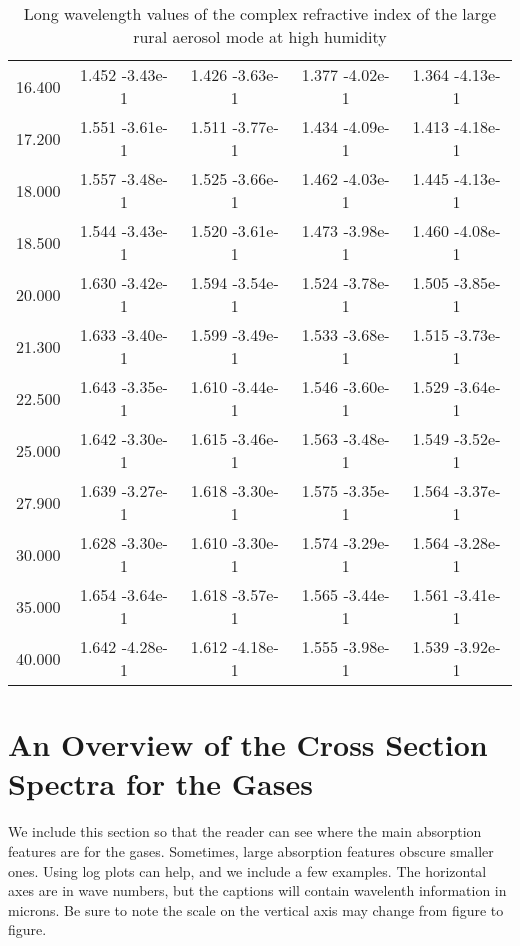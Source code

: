 \documentclass[12pt]{article}
\begin{document}
\begin{center}
\begin{table}
\begin{tabular}{| c | c | c | c | c |  }
16.400  &   1.452   -3.43e-1 &   1.426   -3.63e-1  &  1.377   -4.02e-1  &  1.364   -4.13e-1  \\
17.200  &   1.551   -3.61e-1  &  1.511   -3.77e-1 &   1.434   -4.09e-1 &   1.413   -4.18e-1  \\
18.000  &   1.557   -3.48e-1 &   1.525   -3.66e-1 &   1.462   -4.03e-1 &   1.445   -4.13e-1  \\
18.500  &   1.544   -3.43e-1 &   1.520   -3.61e-1 &   1.473   -3.98e-1 &   1.460   -4.08e-1  \\
20.000  &   1.630   -3.42e-1 &   1.594   -3.54e-1  &  1.524   -3.78e-1 &   1.505   -3.85e-1  \\
21.300  &   1.633   -3.40e-1  &  1.599   -3.49e-1 &   1.533   -3.68e-1 &   1.515   -3.73e-1  \\
22.500  &   1.643   -3.35e-1  &  1.610   -3.44e-1 &   1.546   -3.60e-1  &  1.529   -3.64e-1  \\
25.000  &   1.642   -3.30e-1  &  1.615   -3.46e-1 &   1.563   -3.48e-1  &  1.549   -3.52e-1  \\
27.900  &   1.639   -3.27e-1  &  1.618   -3.30e-1 &   1.575   -3.35e-1  &  1.564   -3.37e-1  \\
30.000  &   1.628   -3.30e-1 &   1.610   -3.30e-1 &   1.574   -3.29e-1  &  1.564   -3.28e-1  \\
35.000  &   1.654   -3.64e-1 &   1.618   -3.57e-1  &  1.565   -3.44e-1  &  1.561   -3.41e-1  \\
40.000  &   1.642   -4.28e-1 &   1.612   -4.18e-1  &  1.555   -3.98e-1  &  1.539   -3.92e-1 \\
\hline
\end{tabular}
\caption{Long wavelength values of the complex refractive index of the large rural aerosol mode at high humidity}
\end{table}
\end{center}

\section{An Overview of the Cross Section Spectra for the Gases}

We include this section so that the reader can see where the main absorption features are for the gases.
Sometimes, large absorption features obscure smaller ones. Using log plots can help, and we include a few examples.
The horizontal axes are in wave numbers, but the captions will contain wavelenth information in microns. Be
sure to note the scale on the vertical axis may change from figure to figure.
\end{document}
